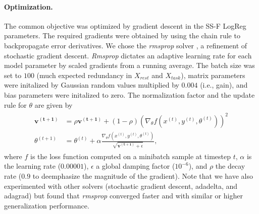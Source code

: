 \documentclass{article} %
\begin{document}
\paragraph{Optimization.}
The common objective was optimized
by gradient descent in the SS-F LogReg parameters.
%
The required gradients were obtained by using the chain rule to
backpropagate error derivatives.
We chose the \textit{rmsprop} solver \cite{rmsprop},
a refinement of stochastic gradient descent.
\textit{Rmsprop} dictates an adaptive learning rate
for each model parameter by
scaled gradients from a running average.
The batch size was set to $100$
(much expected redundancy in $X_{rest}$ and $X_{task}$),
matrix parameters were initalized by Gaussian random values multiplied
by $0.004$ (i.e., gain), and
bias parameters were initalized to zero.
%
The normalization factor and the update rule for $\theta$
are given by
%
\begin{eqnarray}
  \begin{split}
    \mathbf{v^{(t+1)}} &= \rho \mathbf{v^{(t+1)}} + (1 - \rho)\left(\nabla_{\theta} f(x^{(t)}, y^{(t)}, \theta^{(t)})\right)^2
\\
\theta^{(t+1)} &= \theta^{(t)} + \alpha \frac{\nabla_{\theta} f(x^{(t)}, y^{(t)}, \theta^{(t)})}{\sqrt{\mathbf{v^{(t+1)}} + \epsilon}},
  \end{split}
\end{eqnarray}
where $f$ is the loss function computed on a minibatch sample at timestep $t$,
$\alpha$ is the learning rate ($0.00001$),
$\epsilon$ a global damping factor ($10^{-6}$),
and
$\rho$ the decay rate ($0.9$ to deemphasize the magnitude of the gradient).
%
Note that we have also experimented with other solvers
(stochastic gradient descent, adadelta, and adagrad) but found that
\textit{rmsprop} converged faster and with
similar or higher generalization performance.
\end{document}
